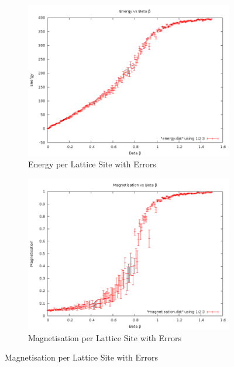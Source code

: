 \documentclass[12pt,a4paper,notitlepage,twoside]{article}
\begin{document}
\begin{figure}[H]
\centering
	\begin{subfigure}[b]{0.45\textwidth}
		\includegraphics[width=\textwidth]{q2d20/energy.png}	
		\caption{Energy per Lattice Site with Errors}
	\end{subfigure}
	\begin{subfigure}[b]{0.45\textwidth}
		\includegraphics[width=\textwidth]{q2d20/magnetisation.png}
		\caption{Magnetisation per Lattice Site with Errors}
	\end{subfigure}
\end{figure}
\end{document}
